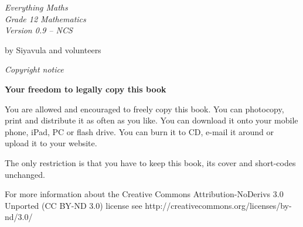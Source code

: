 

\newpage
\thispagestyle{empty}

\begin{center}

    \vspace*{4in}

    {\normalfont\sffamily\fontsize{36}\normalfont\itshape{Everything Maths } \\ \vspace*{1cm}
    {\normalfont\sffamily\fontsize{22}\normalfont\itshape{Grade 12 Mathematics}}
    \vspace*{1in} \\
    \LARGE Version 0.9 -- NCS\\

   {\vspace*{2in}
     by Siyavula and volunteers 
  

\vfill

    }}
\end{center}






\newpage
\thispagestyle{empty}
{
\begin{center}
\normalfont\sffamily\fontsize{22}\normalfont\itshape Copyright notice\\

\vspace*{1in}

\textbf{Your freedom to legally copy this book}\\

\end{center}
}

{\LARGE
You are allowed and encouraged to freely copy this book. You can photocopy, print and distribute it as
often as you like. You can download it onto your mobile phone, iPad, PC or flash drive. You can burn it
to CD, e-mail it around or upload it to your website. \par

The only restriction is that you have to keep this book, its cover and short-codes unchanged.\par

For more information about the Creative Commons Attribution-NoDerivs 3.0 Unported (CC BY-ND
3.0) license see http://creativecommons.org/licenses/by-nd/3.0/}\\

